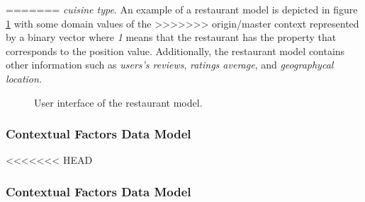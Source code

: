 =======
\textit{cuisine type}. An example of a restaurant model is depicted in
figure \ref{fig:restaurantmodel} with some domain values of the
>>>>>>> origin/master
context represented by a binary vector where \textit{1} means that the
restaurant has the property that corresponds to the position value.
Additionally, the restaurant model contains other information such as
\textit{users's reviews}, \textit{ratings average}, and
\textit{geographycal location.}
\begin{figure}
\captionsetup{justification=centering,margin=2cm,font=footnotesize}
\centering
\setlength\fboxsep{0pt}
\setlength\fboxrule{0.7pt}
\caption{User interface of the restaurant model.}
\label{fig:restaurantmodel}       
\end{figure}
\subsubsection{Contextual Factors Data Model} \label{datamodelsection}   

<<<<<<< HEAD
\subsubsection{Contextual Factors Data Model} \label{datamodelsection}   

